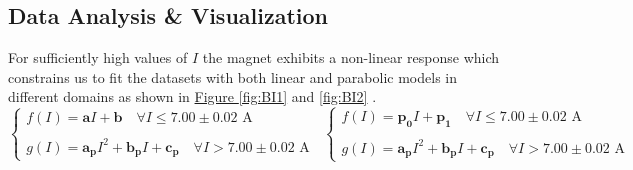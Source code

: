 \documentclass[a4paper,12pt,abstracton]{scrartcl}
\begin{document}
\subsection{Data Analysis \& Visualization}
For sufficiently high values of $I$ the magnet exhibits a non-linear response which constrains us to fit the datasets with both linear and parabolic models in different domains as shown in \hyperref[fig:BI1]{Figure \ref*{fig:BI1}}  and \hyperref[fig:BI2]{ \ref*{fig:BI2}} .
$$
\begin{cases}
f(I)=\boldsymbol{a} I + \boldsymbol{b} \quad \forall I \leq 7.00 \pm 0.02 \text{ A} \\ \\
g(I)= \boldsymbol{a_p}I^2 + \boldsymbol{b_p}I + \boldsymbol{c_p} \quad \forall I > 7.00 \pm 0.02 \text{ A}
\end{cases}
\;\;
\begin{cases}
f(I)=\boldsymbol{p_0} I + \boldsymbol{p_1} \quad \forall I \leq 7.00 \pm 0.02 \text{ A} \\ \\
g(I)= \boldsymbol{a_p}I^2 + \boldsymbol{b_p}I + \boldsymbol{c_p} \quad \forall I > 7.00 \pm 0.02 \text{ A}
\end{cases}
$$
\end{document}
